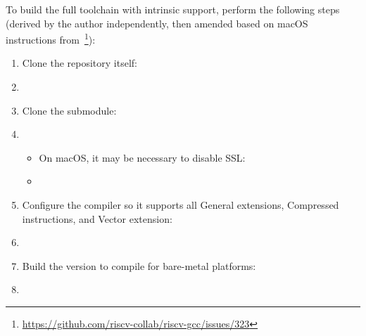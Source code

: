 To build the full toolchain with intrinsic support, perform the following steps (derived by the author independently, then amended based on macOS instructions from~\footnote{\url{https://github.com/riscv-collab/riscv-gcc/issues/323}}):
\begin{enumerate}
    \item Clone the repository itself:
    \item[\code{\$}] 
    \item Clone the  submodule:
    \item[\code{\$}] 
    \begin{itemize}
        \item On macOS, it may be necessary to disable SSL:
        \item[\code{\$}] 
    \end{itemize}
    \item Configure the compiler so it supports all General extensions, Compressed instructions, and Vector extension:
    \item[\code{\$}] 
    \item Build the  version to compile for bare-metal platforms:
    \item[\code{\$}] 
\end{enumerate}